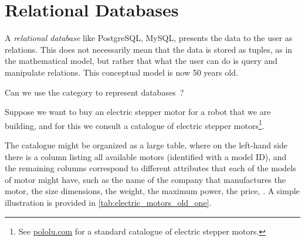 
\section{Relational Databases}
\label{sec:relational-databases}


A \emph{relational database} like PostgreSQL, MySQL, \etc presents the data to the user as relations.
This does not necessarily mean that the data is stored as tuples, as in the mathematical model, but rather that what the user can do is query and manipulate relations.
This conceptual model is now 50 years old.

Can we use the category \Rel to represent databases~\cite{codd2002relational}?

Suppose we want to buy an electric stepper motor for a robot that we are building, and for this we consult a catalogue of electric stepper motors\footnote{See \href{https://www.pololu.com/category/87/stepper-motors}{pololu.com} for a standard catalogue of electric stepper motors.
}.

The catalogue might be organized as a large table, where on the left-hand side there is a column listing all available motors (identified with a model ID), and the remaining columns correspond to different attributes that each of the models of motor might have, such as the name of the company that manufactures the motor, the size dimensions, the weight, the maximum power, the price, \etc.
A simple illustration is provided in \cref{tab:electric_motors_old_one}.


